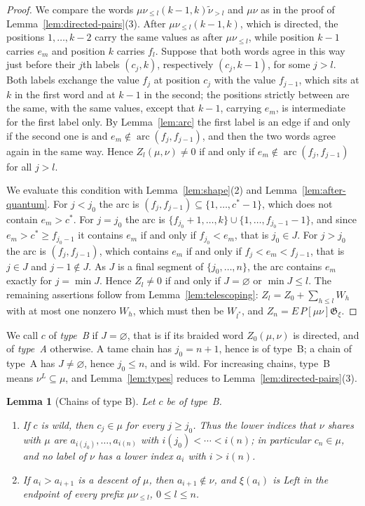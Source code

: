 \documentclass[11pt]{article}
\newtheorem{lemma}[proposition]{Lemma}
\newcommand{\G}{\mathfrak{G}}
\begin{document}
\begin{proof}
We compare the words $\mu\nu_{\leq l}(k-1,k)\tilde\nu_{>l}$ and
$\mu\nu$ as in the proof of Lemma~\ref{lem:directed-pairs}(3). After
$\mu\nu_{\leq l}(k-1,k)$, which is directed, the positions
$1,\ldots,k-2$ carry the same values as after $\mu\nu_{\leq l}$, while
position $k-1$ carries $e_m$ and position $k$ carries $f_l$. Suppose
that both words agree in this way just before their $j$th labels
$(c_j,k)$, respectively $(c_j,k-1)$, for some $j>l$. Both labels
exchange the value $f_j$ at position $c_j$ with the value $f_{j-1}$,
which sits at $k$ in the first word and at $k-1$ in the second; the
positions strictly between are the same, with the same values, except
that $k-1$, carrying $e_m$, is intermediate for the first label only.
By Lemma~\ref{lem:arc} the first label is an edge if and only if the
second one is and $e_m\notin\operatorname{arc}(f_j,f_{j-1})$, and then
the two words agree again in the same way. Hence
$Z_l(\mu,\nu)\neq0$ if and only if
$e_m\notin\operatorname{arc}(f_j,f_{j-1})$ for all $j>l$.

We evaluate this condition with Lemma~\ref{lem:shape}(2) and
Lemma~\ref{lem:after-quantum}. For $j<j_0$ the arc is
$(f_j,f_{j-1})\subseteq\{1,\ldots,c^\ast-1\}$, which does not contain
$e_m>c^\ast$. For $j=j_0$ the arc is
$\{f_{j_0}+1,\ldots,k\}\cup\{1,\ldots,f_{j_0-1}-1\}$, and since
$e_m>c^\ast\geq f_{j_0-1}$ it contains $e_m$ if and only if
$f_{j_0}<e_m$, that is $j_0\in J$. For $j>j_0$ the arc is
$(f_j,f_{j-1})$, which contains $e_m$ if and only if
$f_j<e_m<f_{j-1}$, that is $j\in J$ and $j-1\notin J$. As $J$ is a
final segment of $\{j_0,\ldots,n\}$, the arc contains $e_m$ exactly
for $j=\min J$. Hence $Z_l\neq0$ if and only if $J=\varnothing$ or
$\min J\leq l$. The remaining assertions follow from
Lemma~\ref{lem:telescoping}: $Z_l=Z_0+\sum_{h\leq l}W_h$ with at most
one nonzero $W_h$, which must then be $W_{l^\ast}$, and
$Z_n=E\,P[\mu\nu]\G_\xi$.
\end{proof}

We call $c$ of \emph{type~B} if $J=\varnothing$, that is if its
braided word $Z_0(\mu,\nu)$ is directed, and of \emph{type~A}
otherwise. A tame chain has $j_0=n+1$, hence is of type~B; a chain of
type~A has $J\neq\varnothing$, hence $j_0\leq n$, and is wild. For
increasing chains, type~B means $\nu^L\subseteq\mu$, and
Lemma~\ref{lem:types} reduces to Lemma~\ref{lem:directed-pairs}(3).

\begin{lemma}[Chains of type B]\label{lem:typeB}
Let $c$ be of type~B.
\begin{enumerate}
\item If $c$ is wild, then $c_j\in\mu$ for every $j\geq j_0$. Thus the
 lower indices that $\nu$ shares with $\mu$ are
 $a_{i(j_0)},\ldots,a_{i(n)}$ with $i(j_0)<\cdots<i(n)$; in particular
 $c_n\in\mu$, and no label of $\nu$ has a lower index $a_i$ with
 $i>i(n)$.
\item If $a_i>a_{i+1}$ is a descent of $\mu$, then $a_{i+1}\notin\nu$,
 and $\xi(a_i)$ is Left in the endpoint of every prefix
 $\mu\nu_{\leq l}$, $0\leq l\leq n$.
\end{enumerate}
\end{lemma}
\end{document}
